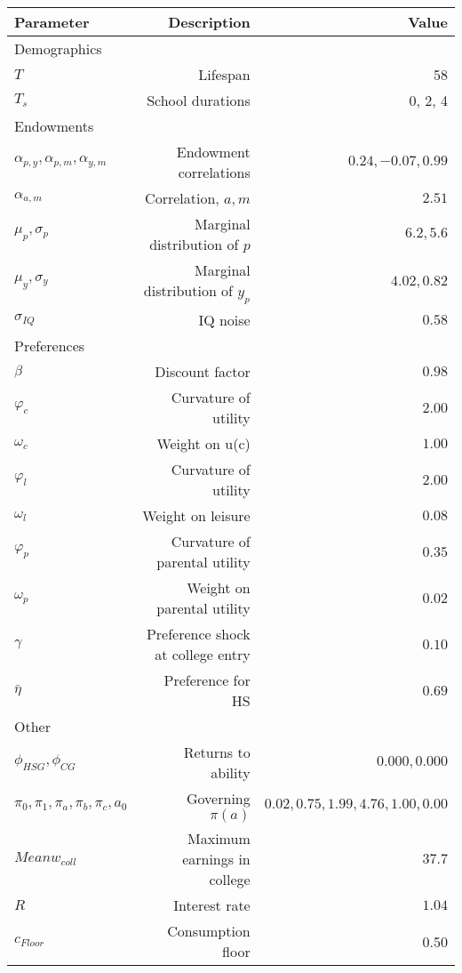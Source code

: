 \begin{tabular}{lrr}
\hline
Parameter & Description  & Value  \\
\hline
Demographics &   &   \\
$T$ & Lifespan  & 58  \\
$T_{s}$ & School durations  & 0, 2, 4  \\
Endowments &   &   \\
$\alpha_{p,y}, \alpha_{p,m}, \alpha_{y,m}$ & Endowment correlations  & $0.24, -0.07, 0.99$  \\
$\alpha_{a,m}$ & Correlation, $a,m$  & $2.51$  \\
$\mu_{p}, \sigma_{p}$ & Marginal distribution of $p$  & $6.2, 5.6$  \\
$\mu_{y}, \sigma_{y}$ & Marginal distribution of $y_{p}$  & $4.02, 0.82$  \\
$\sigma_{IQ}$ & IQ noise  & $0.58$  \\
Preferences &   &   \\
$\beta$ & Discount factor  & $0.98$  \\
$\varphi_{c}$ & Curvature of utility  & $2.00$  \\
$\omega_{c}$ & Weight on u(c)  & $1.00$  \\
$\varphi_{l}$ & Curvature of utility  & $2.00$  \\
$\omega_{l}$ & Weight on leisure  & $0.08$  \\
$\varphi_{p}$ & Curvature of parental utility  & $0.35$  \\
$\omega_{p}$ & Weight on parental utility  & $0.02$  \\
$\gamma$ & Preference shock at college entry  & $0.10$  \\
$\bar{\eta}$ & Preference for HS  & $0.69$  \\
Other &   &   \\
$\phi_{HSG}, \phi_{CG}$ & Returns to ability  & $0.000, 0.000$  \\
$\pi_{0}, \pi_{1}, \pi_{a}, \pi_{b}, \pi_{c}, a_{0}$ & Governing $\pi(a)$  & $0.02, 0.75, 1.99, 4.76, 1.00, 0.00$  \\
$Mean w_{coll}$ & Maximum earnings in college  & $37.7$  \\
$R$ & Interest rate  & $1.04$  \\
$c_{Floor}$ & Consumption floor  & 0.50  \\
\hline
\end{tabular}%
